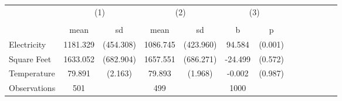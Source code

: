 {
\def\sym#1{\ifmmode^{#1}\else\(^{#1}\)\fi}
\begin{tabular}{l*{3}{cccc}}
\hline\hline
                    &\multicolumn{2}{c}{(1)}  &\multicolumn{2}{c}{(2)}  &\multicolumn{2}{c}{(3)}  \\
                    &\multicolumn{2}{c}{}     &\multicolumn{2}{c}{}     &\multicolumn{2}{c}{}     \\
                    &        mean&          sd&        mean&          sd&           b&           p\\
\hline
Electricity         &    1181.329&   (454.308)&    1086.745&   (423.960)&      94.584&     (0.001)\\
Square Feet         &    1633.052&   (682.904)&    1657.551&   (686.271)&     -24.499&     (0.572)\\
Temperature         &      79.891&     (2.163)&      79.893&     (1.968)&      -0.002&     (0.987)\\
\hline
Observations        &         501&            &         499&            &        1000&            \\
\hline\hline
\end{tabular}
}
